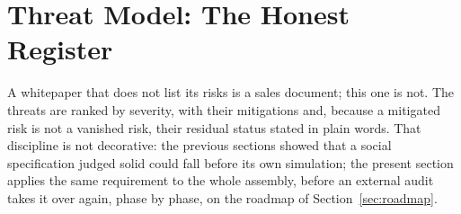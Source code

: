 
\section{Threat Model: The Honest Register}\label{sec:threats}

A whitepaper that does not list its risks is a sales document; this one
is not. The threats are ranked by severity, with their mitigations and,
because a mitigated risk is not a vanished risk, their residual status
stated in plain words. That discipline is not decorative: the previous
sections showed that a social specification judged solid could fall
before its own simulation; the present section applies the same
requirement to the whole assembly, before an external audit takes it
over again, phase by phase, on the roadmap of Section~\ref{sec:roadmap}.

